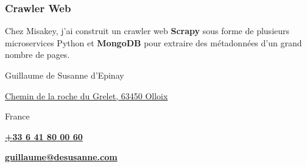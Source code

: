 \documentclass[withoutsidebar, hidelinks]{simplehipstercv}
\newlength{\rightcolwidth}
\begin{document}
\begin{paracol}{2}
\begin{minipage}[t]{0.45\rightcolwidth}
    \subsubsection*{Crawler Web}
    Chez Misakey, j'ai construit un crawler web \textbf{Scrapy} sous forme de plusieurs microservices Python et \textbf{MongoDB} pour extraire des métadonnées d'un grand nombre de pages.
  \end{minipage}


  \vfill{} %

  \setlength{\parindent}{0pt}
  \begin{minipage}[t]{0.9\rightcolwidth}
    \begin{center}\fontfamily{\sfdefault}\selectfont \color{black!70}
      {
        \small Guillaume de Susanne d'Epinay

        \href{geo:45.6214539,3.0495612}{ Chemin de la roche du Grelet, 63450 Olloix}

         France


        \href{tel:+33 6 41 80 00 60}{ \textbf{+33 6 41 80 00 60}}

        \href{mailto:guillaume@desusanne.com}{ \textbf{guillaume@desusanne.com}}

      }
    \end{center}
  \end{minipage}

\end{paracol}
\end{document}
